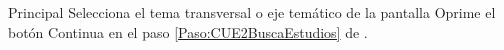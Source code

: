 	
	\begin{UCtrayectoria}{Principal}
		\UCpaso[\UCactor] Selecciona el tema transversal o eje temático de la pantalla 			
		\UCpaso[\UCactor] Oprime el botón 
		\UCpaso Continua en el paso \ref{Paso:CUE2BuscaEstudios} de .
	\end{UCtrayectoria}
	
%
